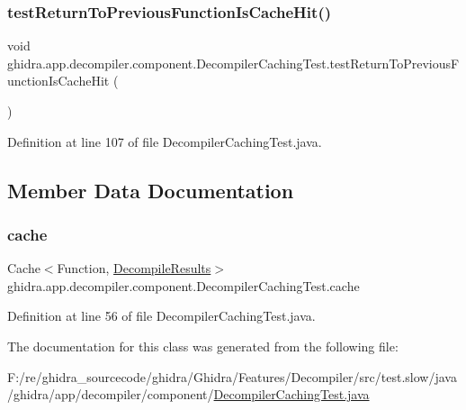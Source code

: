 \subsubsection{\texorpdfstring{testReturnToPreviousFunctionIsCacheHit()}{testReturnToPreviousFunctionIsCacheHit()}}
{\footnotesize\ttfamily void ghidra.\+app.\+decompiler.\+component.\+Decompiler\+Caching\+Test.\+test\+Return\+To\+Previous\+Function\+Is\+Cache\+Hit (\begin{DoxyParamCaption}{ }\end{DoxyParamCaption})\hspace{0.3cm}{\ttfamily [inline]}}



Definition at line 107 of file Decompiler\+Caching\+Test.\+java.



\subsection{Member Data Documentation}
\mbox{\label{classghidra_1_1app_1_1decompiler_1_1component_1_1_decompiler_caching_test_a22e5cb23f95bca980829111149dce029}} 
\subsubsection{\texorpdfstring{cache}{cache}}
{\footnotesize\ttfamily Cache$<$Function, \mbox{\hyperlink{classghidra_1_1app_1_1decompiler_1_1_decompile_results}{Decompile\+Results}}$>$ ghidra.\+app.\+decompiler.\+component.\+Decompiler\+Caching\+Test.\+cache}



Definition at line 56 of file Decompiler\+Caching\+Test.\+java.



The documentation for this class was generated from the following file\+:\begin{DoxyCompactItemize}
\item 
F\+:/re/ghidra\+\_\+sourcecode/ghidra/\+Ghidra/\+Features/\+Decompiler/src/test.\+slow/java/ghidra/app/decompiler/component/\mbox{\hyperlink{_decompiler_caching_test_8java}{Decompiler\+Caching\+Test.\+java}}\end{DoxyCompactItemize}
